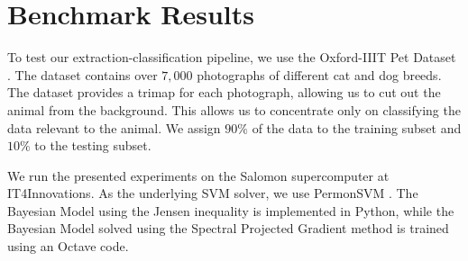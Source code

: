 \documentclass{aip-cp}
\begin{document}
\section{Benchmark Results}
To test our extraction-classification pipeline, we use the Oxford-IIIT Pet Dataset \cite{parkhi12a}. The dataset contains over $7,000$ photographs of different cat and dog breeds. The dataset provides a trimap for each photograph, allowing us to cut out the animal from the background. This allows us to concentrate only on classifying the data relevant to the animal. We assign $90\%$ of the data to the training subset and $10\%$ to the testing subset.

We run the presented experiments on the Salomon supercomputer \cite{Salomon-WWW-17} at IT4Innovations. As the underlying SVM solver, we use PermonSVM \cite{permonSVM}. The Bayesian Model using the Jensen inequality is implemented in Python, while the Bayesian Model solved using the Spectral Projected Gradient method is trained using an Octave code.
\end{document}
